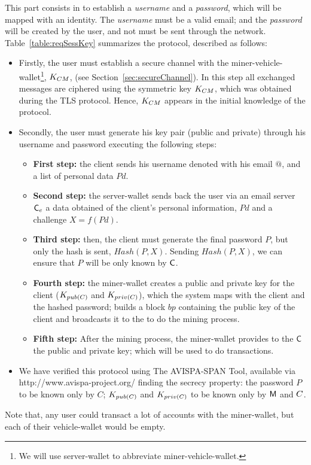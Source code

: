 This part consists in to establish a \textit{username} and a \textit{password}, which will be mapped with an identity. 
The \textit{username} must be a valid email; and the \textit{password} will be created by the user, and not must be sent through the network. 
Table~\ref{table:reqSessKey} summarizes the protocol, described as follows: 

\begin{itemize}
  \item Firstly, the user must establish a secure channel with the miner-vehicle-wallet\footnote{
        We will use server-wallet to abbreviate miner-vehicle-wallet.},
    $K_{CM}$,
    (see Section~\ref{sec:secureChannel}). In this step all exchanged messages are ciphered 
    using the symmetric key $K_{CM}$, which was obtained during the TLS protocol.
    Hence, $K_{CM}$ appears in the initial knowledge of the protocol.
  \item Secondly, the user must generate his key pair (public and private) through
    his username and password executing the following steps:
    \begin{itemize}
    \item \textbf{First step:} the client sends his username denoted with his email $@$, and  
        a list of personal data $Pd$. 
    \item \textbf{Second step:} the server-wallet sends back the user via an email server $\textsf{C}_e$ a 
        data obtained of the client's personal information, $Pd$ and a challenge $X=f(Pd)$. 
    \item \textbf{Third step:} then, the client must generate the final password $P$, but
      only the hash is sent, $Hash(P,X)$.  Sending $Hash(P,X)$, we can
      ensure that $P$ will be only known by $\textsf{C}$.
    \item \textbf{Fourth step:} the miner-wallet creates a public and private key for the client 
        ($K_{pub(C)}$ and $K_{priv(C)}$), which the system maps with the client and 
        the hashed password; builds a block $bp$ containing the public key of the client and broadcasts
        it to the \blockchaincarnetwork to do the mining process. 
    \item \textbf{Fifth step:} After the mining process, the miner-wallet provides to the $\textsf{C}$ the 
        public and private key; which will be used to do transactions. 
    \end{itemize}
  \item We have verified this protocol using The AVISPA-SPAN Tool, available via http://www.avispa-project.org/ finding the secrecy property:
        the password $P$ to be known only by $C$; $K_{pub(C)}$ and $K_{priv(C)}$ to be known only by $\textsf{M}$ and $C$.
\end{itemize}
Note that, any user could transact a lot of accounts with the miner-wallet, but each of their 
vehicle-wallet would be empty.

